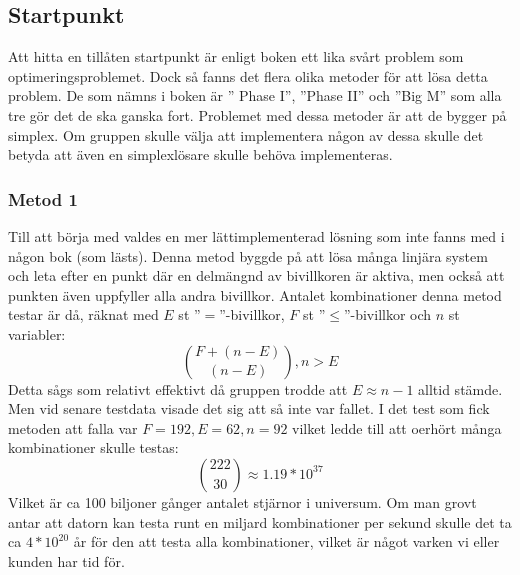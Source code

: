 \subsection{Startpunkt}
Att hitta en tillåten startpunkt är enligt boken ett lika svårt problem som optimeringsproblemet. Dock så fanns det flera olika metoder för att lösa detta problem. De som nämns i boken är '' Phase I'', ''Phase II'' och ''Big M'' som alla tre gör det de ska ganska fort. Problemet med dessa metoder är att de bygger på simplex. Om gruppen skulle välja att implementera någon av dessa skulle det betyda att även en simplexlösare skulle behöva implementeras. 

\subsubsection{Metod 1}
Till att börja med valdes en mer lättimplementerad lösning som inte fanns med i någon bok (som lästs). Denna metod byggde på att lösa många linjära system och leta efter en punkt där en delmängnd av bivillkoren är aktiva, men också att punkten även uppfyller alla andra bivillkor. Antalet kombinationer denna metod testar är då, räknat med $E$ st ''$=$''-bivillkor, $F$ st ''$\leq$''-bivillkor och $n$ st variabler:
$${F+(n-E) \choose (n-E)}, n>E $$
Detta sågs som relativt effektivt då gruppen trodde att $E \approx n-1$ alltid stämde. Men vid senare testdata visade det sig att så inte var fallet. I det test som fick metoden att falla var $F = 192, E = 62, n = 92$ vilket ledde till att oerhört många kombinationer skulle testas:
$${222 \choose 30} \approx 1.19*10^{37}$$
Vilket är ca 100 biljoner gånger antalet stjärnor i universum. Om man grovt antar att datorn kan testa runt en miljard kombinationer per sekund skulle det ta ca $4*10^{20}$ år för den att testa alla kombinationer, vilket är något varken vi eller kunden har tid för.

